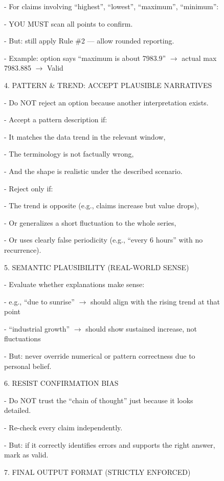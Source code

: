 \documentclass[11pt]{article}
\begin{document}
\begin{figure}[t]
\begin{tcolorbox}[promptbox]
    - For claims involving ``highest'', ``lowest'', ``maximum'', ``minimum'':
    
        - YOU MUST scan all points to confirm.
        
        - But: still apply Rule \#2 — allow rounded reporting.
        
    - Example: option says ``maximum is about 7983.9'' $\rightarrow$ actual max 7983.885 $\rightarrow$ Valid

4.  PATTERN \& TREND: ACCEPT PLAUSIBLE NARRATIVES

    - Do NOT reject an option because another interpretation exists.
    
    - Accept a pattern description if:
    
        - It matches the data trend in the relevant window,
        
        - The terminology is not factually wrong,
        
        - And the shape is realistic under the described scenario.
        
    - Reject only if:
    
        - The trend is opposite (e.g., claims increase but value drops),
        
        - Or generalizes a short fluctuation to the whole series,
        
        - Or uses clearly false periodicity (e.g., ``every 6 hours'' with no recurrence).

5.  SEMANTIC PLAUSIBILITY (REAL-WORLD SENSE)

    - Evaluate whether explanations make sense:
    
        - e.g., ``due to sunrise'' $\rightarrow$ should align with the rising trend at that point
        
        - ``industrial growth'' $\rightarrow$ should show sustained increase, not fluctuations

    - But: never override numerical or pattern correctness due to personal belief.

6.  RESIST CONFIRMATION BIAS

    - Do NOT trust the ``chain of thought'' just because it looks detailed.
    
    - Re-check every claim independently.
    
    - But: if it correctly identifies errors and supports the right answer, mark as valid.

7.  FINAL OUTPUT FORMAT (STRICTLY ENFORCED)


\end{tcolorbox}
\end{figure}
\end{document}
